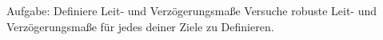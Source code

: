 \begin{frame}[c]
    \begin{block}{Aufgabe: Definiere Leit- und Verzögerungsmaße}
        Versuche robuste Leit- und Verzögerungsmaße für jedes deiner Ziele zu
        Definieren.
    \end{block}
\end{frame}


%
%
%
%




%
%


